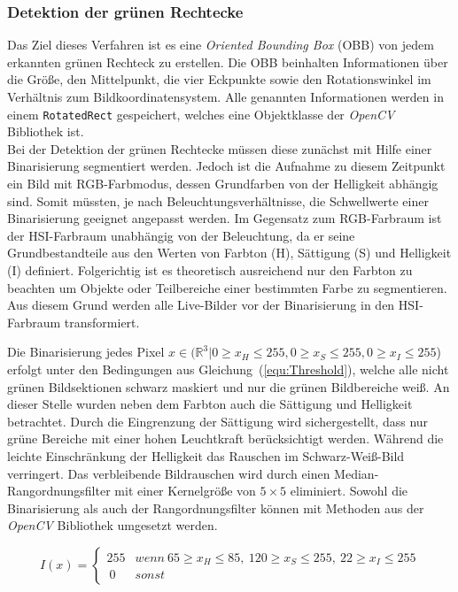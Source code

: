 \subsubsection{Detektion der grünen Rechtecke}\label{sec:GreenRects}%
Das Ziel dieses Verfahren ist es eine \textit{Oriented Bounding Box} (OBB) von jedem erkannten grünen Rechteck zu erstellen. Die OBB beinhalten Informationen über die Größe, den Mittelpunkt, die vier Eckpunkte sowie den Rotationswinkel im Verhältnis zum Bildkoordinatensystem. Alle genannten Informationen werden in einem \texttt{Rotated\-Rect} gespeichert, welches eine Objektklasse der \textit{OpenCV} Bibliothek ist.\\
Bei der Detektion der grünen Rechtecke müssen diese zunächst mit Hilfe einer Binarisierung segmentiert werden. Jedoch ist die Aufnahme zu diesem Zeitpunkt ein Bild mit RGB-Farbmodus, dessen Grundfarben von der Helligkeit abhängig sind. Somit müssten, je nach Beleuchtungsverhältnisse, die Schwellwerte einer Binarisierung geeignet angepasst werden. Im Gegensatz zum RGB-Farbraum ist der HSI-Farbraum unabhängig von der Beleuchtung, da er seine Grundbestandteile aus den Werten von Farbton (H), Sättigung (S) und Helligkeit (I) definiert. Folgerichtig ist es theoretisch ausreichend nur den Farbton zu beachten um Objekte oder Teilbereiche einer bestimmten Farbe zu segmentieren. Aus diesem Grund werden alle Live-Bilder vor der Binarisierung in den HSI-Farbraum transformiert.

Die Binarisierung jedes Pixel $x \in (\mathbb{R}^{3} | 0 \ge x_H \le 255, 0 \ge x_S \le 255, 0 \ge x_I \le 255$) erfolgt unter den Bedingungen aus Gleichung~(\ref{equ:Threshold}), welche alle nicht grünen Bildsektionen schwarz maskiert und nur die grünen Bildbereiche weiß. An dieser Stelle wurden neben dem Farbton auch die Sättigung und Helligkeit betrachtet. Durch die Eingrenzung der Sättigung wird sichergestellt, dass nur grüne Bereiche mit einer hohen Leuchtkraft berücksichtigt werden. Während die leichte Einschränkung der Helligkeit das Rauschen im Schwarz-Weiß-Bild verringert. Das verbleibende Bildrauschen wird durch einen Me\-di\-an-Rang\-ord\-nungs\-fil\-ter mit einer Kernelgröße von $5\times5$ eliminiert. Sowohl die Binarisierung als auch der Rangordnungsfilter können mit Methoden aus der \textit{OpenCV} Bibliothek umgesetzt werden.

\begin{equation}
\label{equ:Threshold}
I(x) = \begin{cases}
255 & wenn \ 65 \ge x_H \le 85, \ 120 \ge x_S \le 255, \ 22 \ge x_I \le 255\\\
0 & sonst
\end{cases}
\end{equation}

